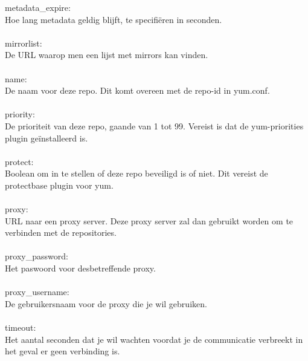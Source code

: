 %
metadata\_expire:\\
Hoe lang metadata geldig blijft, te specifi\"eren in seconden.\\\\
%
mirrorlist:\\
De URL waarop men een lijst met mirrors kan vinden.\\\\
%
name:\\
De naam voor deze repo. Dit komt overeen met de repo-id in yum.conf.\\\\
%
priority:\\
De prioriteit van deze repo, gaande van 1 tot 99. Vereist is dat de yum-priorities plugin ge\"installeerd is.\\\\
%
protect:\\
Boolean om in te stellen of deze repo beveiligd is of niet. Dit vereist de protectbase plugin voor yum.\\\\
%
proxy:\\
URL naar een proxy server. Deze proxy server zal dan gebruikt worden om te verbinden met de repositories.\\\\
%
proxy\_password:\\
Het paswoord voor desbetreffende proxy.\\\\
%
proxy\_username:\\
De gebruikersnaam voor de proxy die je wil gebruiken.\\\\
%
timeout:\\
Het aantal seconden dat je wil wachten voordat je de communicatie verbreekt in het geval er geen verbinding is.\\\\
